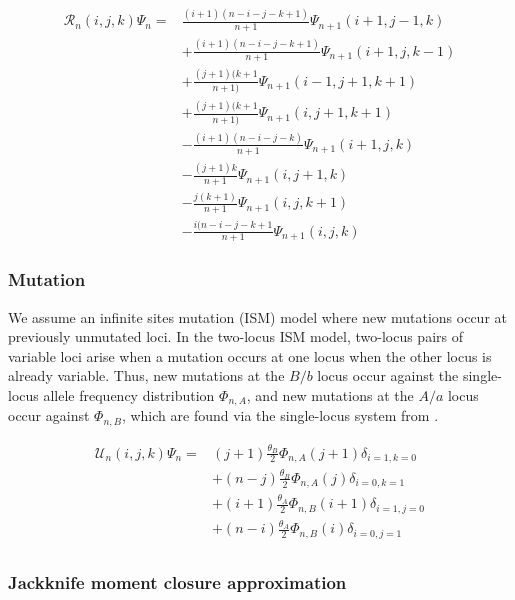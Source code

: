 \documentclass[]{article}
\begin{document}
\begin{align}
\mathcal{R}_{n}(i, j, k)\Psi_n = &
\frac{(i + 1)(n - i - j - k + 1)}{n + 1}\Psi_{n+1}(i + 1, j - 1, k) \\\nonumber
& + \frac{(i + 1)(n - i - j - k + 1)}{n + 1}\Psi_{n+1}(i + 1, j, k - 1) \\\nonumber
& + \frac{(j + 1)(k + 1}{n + 1)}\Psi_{n+1}(i - 1, j + 1, k + 1) \\\nonumber
& + \frac{(j + 1)(k + 1}{n + 1)}\Psi_{n+1}(i, j + 1, k + 1) \\\nonumber
& - \frac{(i + 1)(n - i - j - k)}{n + 1}\Psi_{n+1}(i + 1, j, k) \\\nonumber
& - \frac{(j + 1) k}{n + 1}\Psi_{n+1}(i, j + 1, k) \\\nonumber
& - \frac{j (k + 1)}{n + 1}\Psi_{n+1}(i, j, k + 1) \\\nonumber
& - \frac{i (n - i - j - k + 1}{n + 1}\Psi_{n+1}(i, j, k)
\end{align}

\subsubsection{Mutation}\label{mutation}

We assume an infinite sites mutation (ISM) model where new mutations occur at
previously unmutated loci. In the two-locus ISM model, two-locus pairs of
variable loci arise when a mutation occurs at one locus when the other locus is
already variable. Thus, new mutations at the \(B/b\) locus occur against the
single-locus allele frequency distribution \(\Phi_{n,A}\), and new mutations at
the \(A/a\) locus occur against \(\Phi_{n, B}\), which are found via the single-locus
system from \citet{Jouganous2017-pq}.

\begin{align}
\mathcal{U}_{n}(i, j, k)\Psi_n = &
(j + 1)\frac{\theta_B}{2} \Phi_{n, A}(j+1) \delta_{i=1, k=0} \\\nonumber
& + (n - j)\frac{\theta_B}{2} \Phi_{n, A}(j) \delta_{i=0, k=1} \\\nonumber
& + (i + 1)\frac{\theta_A}{2} \Phi_{n, B}(i+1) \delta_{i=1, j=0} \\\nonumber
& + (n - i)\frac{\theta_A}{2} \Phi_{n, B}(i) \delta_{i=0, j=1} \\\nonumber
\end{align}

\subsubsection{Jackknife moment closure approximation}\label{jackknife-moment-closure-approximation}
\end{document}
